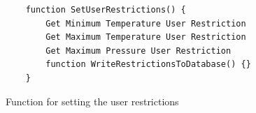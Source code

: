 \documentclass[12pt, a4paper]{article}
\begin{document}
                    \normalsize
                    \footnotesize
                    \begin{figure}[H]
                        \begin{lstlisting}
    function SetUserRestrictions() {
        Get Minimum Temperature User Restriction
        Get Maximum Temperature User Restriction
        Get Maximum Pressure User Restriction
        function WriteRestrictionsToDatabase() {}
    }                                                                     
                        \end{lstlisting}
                        \caption{Function for setting the user restrictions}
                    \end{figure}
                    \normalsize
\end{document}
